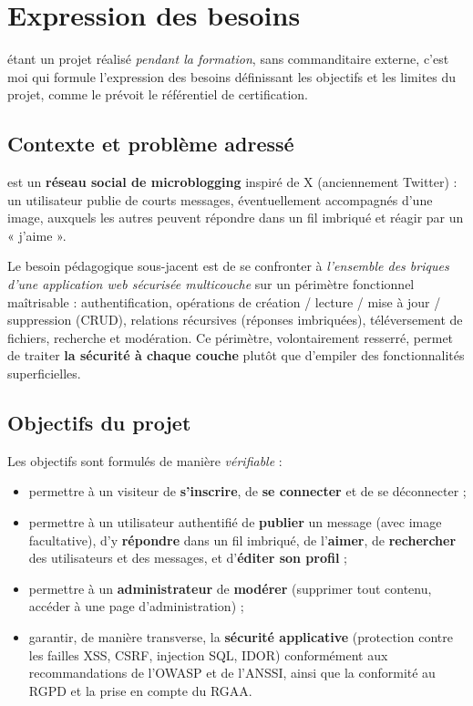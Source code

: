 \chapter{Expression des besoins}
\label{ch:besoins}

\projet{} étant un projet réalisé \emph{pendant la formation}, sans commanditaire externe,
c'est moi qui formule l'expression des besoins définissant les objectifs et les
limites du projet, comme le prévoit le référentiel de certification.

\section{Contexte et problème adressé}

\projet{} est un \textbf{réseau social de microblogging} inspiré de X (anciennement Twitter) :
un utilisateur publie de courts messages, éventuellement accompagnés d'une image, auxquels les
autres peuvent répondre dans un fil imbriqué et réagir par un « j'aime ».

Le besoin pédagogique sous-jacent est de se confronter à \emph{l'ensemble des briques d'une
application web sécurisée multicouche} sur un périmètre fonctionnel maîtrisable :
authentification, opérations de création / lecture / mise à jour / suppression (CRUD), relations
récursives (réponses imbriquées), téléversement de fichiers, recherche et modération. Ce
périmètre, volontairement resserré, permet de traiter \textbf{la sécurité à chaque couche}
plutôt que d'empiler des fonctionnalités superficielles.

\section{Objectifs du projet}

Les objectifs sont formulés de manière \emph{vérifiable} :

\begin{itemize}
  \item permettre à un visiteur de \textbf{s'inscrire}, de \textbf{se connecter} et de se
        déconnecter ;
  \item permettre à un utilisateur authentifié de \textbf{publier} un message (avec image
        facultative), d'y \textbf{répondre} dans un fil imbriqué, de l'\textbf{aimer}, de
        \textbf{rechercher} des utilisateurs et des messages, et d'\textbf{éditer son profil} ;
  \item permettre à un \textbf{administrateur} de \textbf{modérer} (supprimer tout contenu,
        accéder à une page d'administration) ;
  \item garantir, de manière transverse, la \textbf{sécurité applicative} (protection contre
        les failles XSS, CSRF, injection SQL, IDOR) conformément aux recommandations de l'OWASP
        et de l'ANSSI, ainsi que la conformité au RGPD et la prise en compte du RGAA.
\end{itemize}

